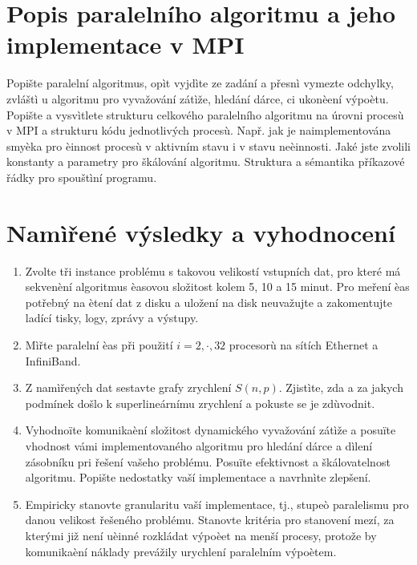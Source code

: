 \documentclass[12pt]{article}
\begin{document}
\section{Popis paralelního algoritmu a jeho implementace v MPI}

Popište paralelní algoritmus, opìt vyjdìte ze zadání a přesnì
vymezte odchylky, zvláštì u algoritmu pro vyvažování zátìže, hledání
dárce, ci ukonèení výpoètu.  Popište a vysvìtlete strukturu
celkového paralelního algoritmu na úrovni procesù v MPI a strukturu
kódu jednotlivých procesù. Např. jak je naimplementována smyèka pro
èinnost procesù v aktivním stavu i v stavu neèinnosti. Jaké jste
zvolili konstanty a parametry pro škálování algoritmu. Struktura a
sémantika příkazové řádky pro spouštìní programu.

\section{Namìřené výsledky a vyhodnocení}

\begin{enumerate}
\item Zvolte tři instance problému s takovou velikostí vstupních dat, pro které má
sekvenèní algoritmus èasovou složitost kolem 5, 10 a 15 minut. Pro
meření èas potřebný na ètení dat z disku a uložení na disk
neuvažujte a zakomentujte ladící tisky, logy, zprávy a výstupy.
\item Mìřte paralelní èas při použití $i=2,\cdot,32$ procesorù na sítích Ethernet a InfiniBand.
\item Z namìřených dat sestavte grafy zrychlení $S(n,p)$. Zjistìte, zda a za jakych podmínek
došlo k superlineárnímu zrychlení a pokuste se je zdùvodnit.
\item Vyhodnoïte komunikaèní složitost dynamického vyvažování zátìže a posuïte
vhodnost vámi implementovaného algoritmu pro hledání dárce a dìlení
zásobníku pri řešení vašeho problému. Posuïte efektivnost a
škálovatelnost algoritmu. Popište nedostatky vaší implementace a
navrhnìte zlepšení.
\item Empiricky stanovte
granularitu vaší implementace, tj., stupeò paralelismu pro danou
velikost řešeného problému. Stanovte kritéria pro stanovení mezí, za
kterými již není uèinné rozkládat výpoèet na menší procesy, protože
by komunikaèní náklady prevážily urychlení paralelním výpoètem.

\end{enumerate}
\end{document}
